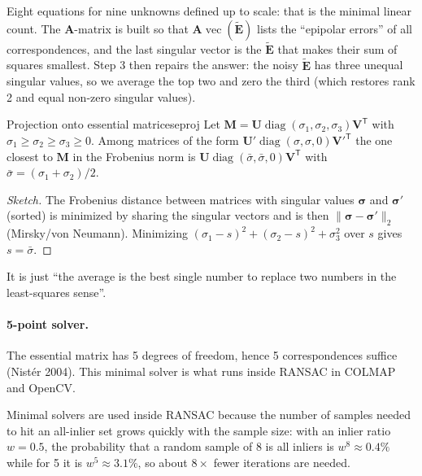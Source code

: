 \documentclass[11pt,a4paper]{article}
\newcommand{\E}{\tilde{\bm E}}
\newcommand{\norm}[1]{\lVert #1\rVert}
\newcommand{\tr}{^{\mathsf T}}
\DeclareMathOperator{\diag}{diag}
\DeclareMathOperator{\vecop}{vec}
\begin{document}
\begin{intuition}
Eight equations for nine unknowns defined up to scale: that is the minimal linear count. The $\bm A$-matrix is built so that $\bm A\vecop(\E)$ lists the ``epipolar errors'' of all correspondences, and the last singular vector is the $\E$ that makes their sum of squares smallest.
Step 3 then repairs the answer: the noisy $\E$ has three unequal singular values, so we average the top two and zero the third (which restores rank 2 and equal non-zero singular values).
\end{intuition}

\begin{lemma}{Projection onto essential matrices}{eproj}
Let $\bm M=\bm U\diag(\sigma_1,\sigma_2,\sigma_3)\bm V\tr$ with $\sigma_1\ge\sigma_2\ge\sigma_3\ge0$. Among matrices of the form $\bm U'\diag(\sigma,\sigma,0){\bm V'}\tr$ the one closest to $\bm M$ in the Frobenius norm is $\bm U\diag(\bar\sigma,\bar\sigma,0)\bm V\tr$ with $\bar\sigma=(\sigma_1+\sigma_2)/2$.
\end{lemma}
\begin{proof}[Sketch]
The Frobenius distance between matrices with singular values $\bm\sigma$ and $\bm\sigma'$ (sorted) is minimized by sharing the singular vectors and is then $\norm{\bm\sigma-\bm\sigma'}_2$ (Mirsky/von Neumann).
Minimizing $(\sigma_1-s)^2+(\sigma_2-s)^2+\sigma_3^2$ over $s$ gives $s=\bar\sigma$.
\end{proof}

\begin{intuition}
It is just ``the average is the best single number to replace two numbers in the least-squares sense''.
\end{intuition}

\paragraph{5-point solver.} The essential matrix has 5 degrees of freedom, hence 5 correspondences suffice (Nist\'er 2004). This minimal solver is what runs inside RANSAC in COLMAP and OpenCV.

\begin{beyond}
Minimal solvers are used inside RANSAC because the number of samples needed to hit an all-inlier set grows quickly with the sample size: with an inlier ratio $w=0.5$, the probability that a random sample of 8 is all inliers is $w^8\approx0.4\%$ while for 5 it is $w^5\approx3.1\%$, so about $8\times$ fewer iterations are needed.
\end{beyond}
\end{document}
